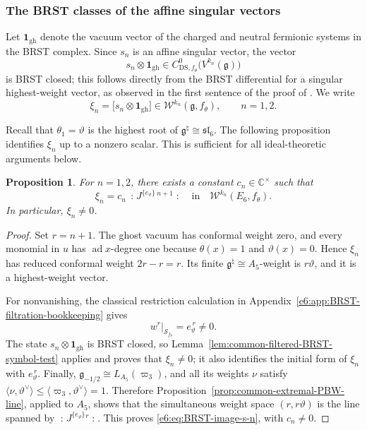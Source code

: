 \documentclass[11pt,reqno]{amsart}
\newtheorem{proposition}[theorem]{Proposition}
\theoremstyle{definition}
\theoremstyle{remark}
\begin{document}
\subsubsection{The BRST classes of the affine singular vectors}


Let $\mathbf1_{\mathrm{gh}}$ denote the vacuum vector of the charged and neutral
fermionic systems in the BRST complex.  Since $s_n$ is an affine singular vector,
the vector
\[
  s_n\otimes\mathbf1_{\mathrm{gh}}
  \in C^0_{\mathrm{DS},f_\theta}\bigl(V^{k_n}(\mathfrak g)\bigr)
\]
is BRST closed; this follows directly from the BRST differential for a singular
highest-weight vector, as observed in the first sentence of the proof of
\cite[Lemma~7.3]{KacWakimoto2004}.  We write
\begin{equation*}
  \xi_n
  =\bigl[s_n\otimes\mathbf1_{\mathrm{gh}}\bigr]
  \in
  \mathcal W^{k_n}(\mathfrak g,f_\theta),
  \qquad n=1,2.
\end{equation*}

Recall that $\theta_1=\vartheta$ is the highest root of
$\mathfrak g^\natural\cong\mathfrak{sl}_6$.  The following proposition identifies
$\xi_n$ up to a nonzero scalar.  This is sufficient for all ideal-theoretic
arguments below.

\begin{proposition}\label{e6:prop:BRST-image-s-n}
For $n=1,2$, there exists a constant $c_n\in\mathbb C^\times$ such that
\begin{equation}\label{e6:eq:BRST-image-s-n}
  \xi_n
  =c_n\,
   \mathopen{:}J^{\{e_\vartheta\}}{}^{\,n+1}\mathclose{:}
  \quad\text{in}\quad
  \mathcal W^{k_n}(E_6,f_\theta).
\end{equation}
In particular, $\xi_n\neq0$.
\end{proposition}

\begin{proof}
Set \(r=n+1\).  The ghost vacuum has conformal weight zero, and every
monomial in \(u\) has \(\operatorname{ad}x\)-degree one because
\(\theta(x)=1\) and \(\vartheta(x)=0\).  Hence \(\xi_n\) has reduced
conformal weight \(2r-r=r\).  Its finite
\(\mathfrak g^\natural\cong A_5\)-weight is \(r\vartheta\), and it is a
highest-weight vector.

For nonvanishing, the classical restriction calculation in
Appendix~\ref{e6:app:BRST-filtration-bookkeeping} gives
\[
 \left.w^r\right|_{\mathcal S_{f_\theta}}
 =e_\vartheta^{\,r}\ne0.
\]
The state $s_n\otimes\mathbf1_{\mathrm{gh}}$ is BRST closed, so
Lemma~\ref{lem:common-filtered-BRST-symbol-test} applies and proves that
$\xi_n\ne0$; it also identifies the initial form of $\xi_n$ with
$e_\vartheta^{\,r}$.  Finally,
\(\mathfrak g_{-1/2}\cong L_{A_5}(\varpi_3)\), and all its weights \(\nu\)
satisfy
\(\langle\nu,\vartheta^\vee\rangle\le
\langle\varpi_3,\vartheta^\vee\rangle=1\).  Therefore
Proposition~\ref{prop:common-extremal-PBW-line}, applied to \(A_5\), shows
that the simultaneous weight space \((r,r\vartheta)\) is the line spanned
by \(\mathopen{:}J^{\{e_\vartheta\}}{}^r\mathclose{:}\).  This proves
\eqref{e6:eq:BRST-image-s-n}, with \(c_n\ne0\).
\end{proof}
\end{document}

